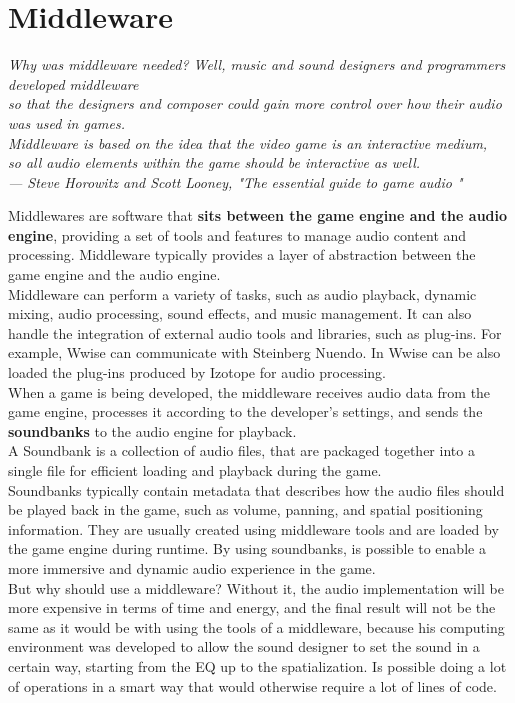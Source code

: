 \section{Middleware}
\begin{flushright}
	\itshape
	Why was middleware needed? Well, music and sound designers and programmers developed middleware \\
	so that the designers and composer could gain more control over how their audio was used in games.\\
	Middleware is based on the idea that the video game is an interactive medium, \\
	so all audio elements within the game should be interactive as well. \\
	\medskip
	--- Steve Horowitz and Scott Looney, "The essential guide to game audio "
\end{flushright}

Middlewares are software that \textbf{sits between the game engine and the audio engine}, providing a set of tools and features to manage audio content and processing. Middleware typically provides a layer of abstraction between the game engine and the audio engine. \\
Middleware can perform a variety of tasks, such as audio playback, dynamic mixing, audio processing, sound effects, and music management. It can also handle the integration of external audio tools and libraries, such as plug-ins. For example, Wwise can communicate with Steinberg Nuendo. In Wwise can be also loaded the plug-ins produced by Izotope for audio processing. \\
When a game is being developed, the middleware receives audio data from the game engine, processes it according to the developer's settings, and sends the \textbf{soundbanks} to the audio engine for playback. \\
A Soundbank is a collection of audio files, that are packaged together into a single file for efficient loading and playback during the game. \\
Soundbanks typically contain metadata that describes how the audio files should be played back in the game, such as volume, panning, and spatial positioning information. They are usually created using middleware tools and are loaded by the game engine during runtime. By using soundbanks, is possible to enable a more immersive and dynamic audio experience in the game. \\
But why should use a middleware? Without it, the audio implementation will be more expensive in terms of time and energy, and the final result will not be the same as it would be with using the tools of a middleware, because his computing environment was developed to allow the sound designer to set the sound in a certain way, starting from the EQ up to the spatialization. Is possible doing a lot of operations in a smart way that would otherwise require a lot of lines of code.

